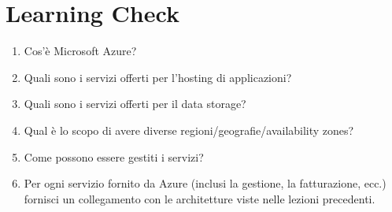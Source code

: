 \section{Learning Check}
\begin{enumerate}
    \item Cos'è Microsoft Azure?
    \item Quali sono i servizi offerti per l'hosting di applicazioni?
    \item Quali sono i servizi offerti per il data storage?
    \item Qual è lo scopo di avere diverse regioni/geografie/availability zones?
    \item Come possono essere gestiti i servizi?
    \item Per ogni servizio fornito da Azure (inclusi la gestione, la fatturazione, ecc.) fornisci un collegamento con le architetture viste nelle lezioni precedenti.
\end{enumerate}

 